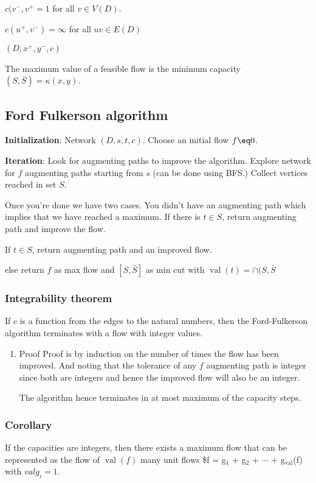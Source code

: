 \documentclass[11pt]{article}
\def\val{\operatorname{val}}
\begin{document}
{\(c(v^{-}, v^{+} =1\) for all \(v \in V(D)\).

\(c(u^+, v^-) = \infty\) for all \(uv \in E(D)\)

\((D, x^+, y^-, c)\)

The maximum value of a feasible flow is the minimum capacity \((S, \bar{S}) =
   \kappa(x, y)\).
\subsection{Ford Fulkerson algorithm}
\label{sec:orgd5eb709}
\textbf{Initialization}: Network \((D, s, t, c)\). Choose an initial flow \(f \eq 0\).

\textbf{Iteration}: Look for augmenting paths to improve the algorithm. Explore
 network for \(f\) augmenting paths starting from \(s\) (can be done using BFS.)
 Collect vertices reached in set \(S\).

Once you're done we have two cases. You didn't have an augmenting path which
implies that we have reached a maximum. If there is \(t\in S\), return
augmenting path and improve the flow.

If \(t\in S\), return augmenting path and an improved flow.

else return \(f\) as max flow and \([S, \bar{S}]\) as min cut with \(\val(t) =
    \cap(S, \bar{S}\)

\subsubsection{Integrability theorem}
\label{sec:org1c9e5dd}
If \(c\) is a function from the edges to the natural numbers, then the
Ford-Fulkerson algorithm terminates with a flow with integer values.
\begin{enumerate}
\item Proof
\label{sec:org8efd1bc}
Proof is by induction on the number of times the flow has been improved.
And noting that the tolerance of any \(f\) augmenting path is integer since
both are integers and hence the improved flow will also be an integer.

The algorithm hence terminates in at most maximum of the capacity steps.
\end{enumerate}
\subsubsection{Corollary}
\label{sec:orgace692a}
If the capacities are integers, then there exists a maximum flow that can be
represented as the flow of \(\val(f)\) many unit flows \$f = g\(_{\text{1}}\) + g\(_{\text{2}}\) +
\(\cdots{}\) + g\(_{\val}\)(f) with \(val g_i = 1\).
}
\end{document}
